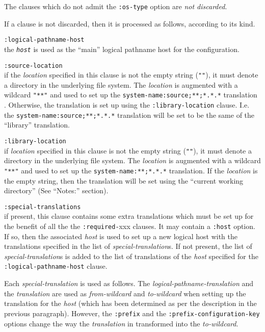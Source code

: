 \documentclass[a4paper]{article}
\newcommand{\notimpl}{\ddag}
\newcommand{\code}[1]{\texttt{#1}}
\newcommand{\clhsterm}[1]{\texttt{\textit{#1}}} %
\begin{document}
The clauses which do not admit the \code{:os-type} option are
\emph{not discarded}.

If a clause is not discarded, then it is processed as follows,
according to its kind.
\begin{description}
\item	\code{:logical-pathname-host}\\
	the \clhsterm{host} is used as the ``main'' logical pathname
	host for the configuration.

\item	\code{:source-location}\\
	if the \emph{location} specified in this clause is not the
	empty string (\code{""}), it must denote a
	directory in the underlying file system. The \emph{location}
	is augmented with a wildcard \code{"**"} and used to set up
	the \code{system-name:source;**;*.*.*} translation
	\notimpl{}. Otherwise, the translation is set up using the
	\code{:library-location} clause. I.e. the
	\code{system-name:source;**;*.*.*} translation will be set to
	be the same of the ``library'' translation.

\item	\code{:library-location}\\
	if \emph{location} specified in this clause is not the
	empty string (\code{""}), it must denote a
	directory in the underlying file system. The \emph{location}
	is augmented with a wildcard \code{"**"} and used to set up
	the \code{system-name:**;*.*.*} translation. If the
	\emph{location} is the empty string, then the translation will
	be set using the ``current working directory'' (See ``Notes:''
	section).

\item	\code{:special-translations}\\
	if present, this clause contains some extra translations which
	must be set up for the benefit of all the the
	\code{:required-}xxx clauses.
	It may contain a \code{:host} option. If so, then the
	associated \emph{host} is used to set up a new logical host
	with the translations specified in the list of
	\emph{special-translation}s.  If not present, the list of
	\emph{special-translation}s is added to the list of
	translations of the \emph{host} specified for the
	\code{:logical-pathname-host} clause.

	Each \emph{special-translation} is used as follows. The
	\emph{logical-pathname-translation} and the \emph{translation}
	are used as \emph{from-wildcard} and \emph{to-wildcard} when
	setting up the translation for the \emph{host} (which has been
	determined as per the description in the previous paragraph).
	However, the \code{:prefix} and the
	\code{:prefix-configuration-key} options change the way the
	\emph{translation} in transformed into the \emph{to-wildcard}.


\end{description}
\end{document}
